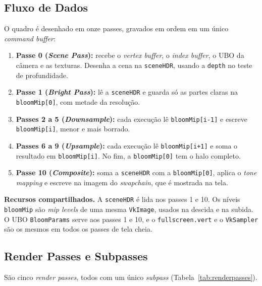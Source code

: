 \subsection{Fluxo de Dados}
O quadro é desenhado em onze passes, gravados em ordem em um único \textit{command buffer}:
\begin{enumerate}
    \setlength{\itemsep}{0pt}
    \item \textbf{Passe 0 (\textit{Scene Pass}):} recebe o \textit{vertex buffer}, o \textit{index buffer}, o UBO da câmera e as texturas. Desenha a cena na \texttt{sceneHDR}, usando a \texttt{depth} no teste de profundidade.
    \item \textbf{Passe 1 (\textit{Bright Pass}):} lê a \texttt{sceneHDR} e guarda só as partes claras na \texttt{bloomMip[0]}, com metade da resolução.
    \item \textbf{Passes 2 a 5 (\textit{Downsample}):} cada execução lê \texttt{bloomMip[i-1]} e escreve \texttt{bloomMip[i]}, menor e mais borrado.
    \item \textbf{Passes 6 a 9 (\textit{Upsample}):} cada execução lê \texttt{bloomMip[i+1]} e soma o resultado em \texttt{bloomMip[i]}. No fim, a \texttt{bloomMip[0]} tem o halo completo.
    \item \textbf{Passe 10 (\textit{Composite}):} soma a \texttt{sceneHDR} com a \texttt{bloomMip[0]}, aplica o \textit{tone mapping} e escreve na imagem do \textit{swapchain}, que é mostrada na tela.
\end{enumerate}
\textbf{Recursos compartilhados.} A \texttt{sceneHDR} é lida nos passes 1 e 10. Os níveis \texttt{bloomMip} são \textit{mip levels} de uma mesma \texttt{VkImage}, usados na descida e na subida. O UBO \texttt{BloomParams} serve aos passes 1 e 10, e o \texttt{fullscreen.vert} e o \texttt{VkSampler} são os mesmos em todos os passes de tela cheia.

\subsection{Render Passes e Subpasses}
São cinco \textit{render passes}, todos com um único \textit{subpass} (Tabela~\ref{tab:renderpasses}).

